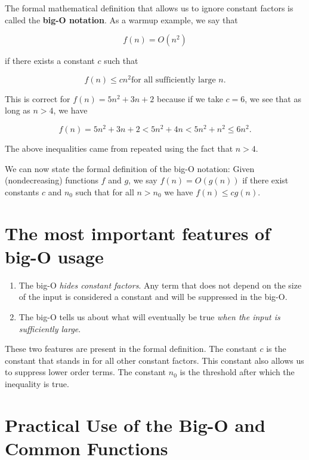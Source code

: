 The formal mathematical definition that allows us to ignore constant factors is called the \textbf{big-O notation}.
As a warmup example, we say that


\[
f(n) = O(n^2)
\]


if there exists a constant $c$ such that


\[
f(n) \le cn^2 \text{for all sufficiently large } n.
\]


This is correct for $f(n) = 5n^2 + 3n + 2$ because if we take $c = 6$, we see that as long as $n > 4$, we have


\[
f(n) = 5n^2 + 3n + 2 < 5n^2 + 4n < 5n^2 + n^2 \le 6n^2.
\]


The above inequalities came from repeated using the fact that $n > 4$.


We can now state the formal definition of the big-O notation:
Given (nondecreasing) functions $f$ and $g$, we say $f(n) = O(g(n))$ if there exist constants $c$ and $n_0$ such that for all $n>n_0$ we have $f(n) \le cg(n)$.

\section{The most important features of big-O usage}

\begin{enumerate}

\item 

The big-O \emph{hides constant factors}.  Any term that does not depend on the size of the input is considered a constant and will be suppressed in the big-O.



\item 

The big-O tells us about what will eventually be true \emph{when the input is sufficiently large}.



\end{enumerate}

These two features are present in the formal definition.
The constant $c$ is the constant that stands in for all other constant factors.
This constant also allows us to suppress lower order terms.
The constant $n_0$ is the threshold after which the inequality is true.

\section{Practical Use of the Big-O and Common Functions}


